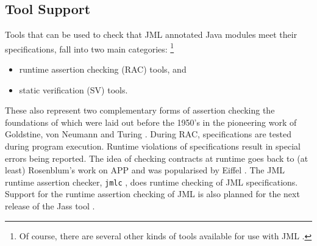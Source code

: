 \documentclass{llncs}
\begin{document}
% 

\subsection{Tool Support}


Tools that can be used to check that JML annotated Java modules meet their
specifications, fall into two main categories:%
%
\footnote{Of course, there are several other kinds of tools available for use
  with JML \cite{STTT05}.}
%
\begin{itemize}
  \item runtime assertion checking (RAC) tools, and
  \item static verification (SV) tools.
\end{itemize}
%
These also represent two complementary forms of assertion checking the
foundations of which were laid out before the 1950's in the pioneering work
of Goldstine, von Neumann and Turing \cite{Jones03}.
%
During RAC, specifications are tested during program execution. Runtime
violations of specifications result in special errors being reported.
%
The idea of checking contracts at runtime
goes back to (at least) Rosenblum's work on APP
\cite{Rosenblum92,Rosenblum95}
and was popularised by Eiffel \cite{Meyer97}.
The JML runtime assertion checker, \texttt{jmlc} \cite{Cheon-Leavens02b},
does runtime checking of JML specifications.
Support for the runtime assertion checking of JML is also planned for the next
release of the Jass tool \cite{Bartetzko-etal01}.
\end{document}
